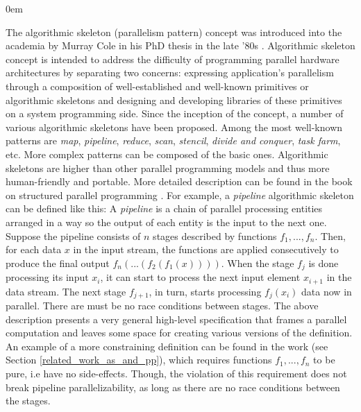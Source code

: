 \begin{description}[style=unboxed,leftmargin=0cm,noitemsep]
\itemsep0em
\item[Algorithmic skeletons or Parallelism Patterns] The algorithmic skeleton (parallelism pattern) concept was introduced into the academia by Murray Cole in his PhD thesis in the late ’80s \cite{mcole-thesis}. Algorithmic skeleton concept is intended to address the difficulty of programming parallel hardware architectures by separating two concerns: expressing application's parallelism through a composition of well-established and well-known primitives or algorithmic skeletons and designing and developing libraries of these primitives on a system programming side. Since the inception of the concept, a number of various algorithmic skeletons have been proposed. Among the most well-known patterns are \textit{map}, \textit{pipeline}, \textit{reduce}, \textit{scan}, \textit{stencil}, \textit{divide and conquer}, \textit{task farm}, etc. More complex patterns can be composed of the basic ones. Algorithmic skeletons are higher than other parallel programming models and thus more human-friendly and portable. More detailed description can be found in the book on structured parallel programming \cite{mccool-patterns}. For example, a \textit{pipeline} algorithmic skeleton can be defined like this:\newline\null
A \textit{pipeline} is a chain of parallel processing entities arranged in a way so the output of each entity is the input to the next one. Suppose the pipeline consists of $n$ stages described by functions $f_{1},...,f_{n}$. Then, for each data $x$ in the input stream, the functions are applied consecutively to produce the final output $f_{n}(...(f_{2}(f_{1}(x))))$. When the stage $f_{j}$ is done processing its input $x_{i}$, it can start to process the next input element $x_{i+1}$ in the data stream. The next stage $f_{j+1}$, in turn, starts processing $f_{j}(x_{i})$ data now in parallel. There are must be no race conditions between stages.\newline\null
\quad The above description presents a very general high-level specification that frames a parallel computation and leaves some space for creating various versions of the definition. An example of a more constraining definition can be found in the work \cite{skeletons-static} (see Section \ref{related_work_as_and_pp}), which requires functions $f_{1},...,f_{n}$ to be pure, i.e have no side-effects. Though, the violation of this requirement does not break pipeline parallelizability, as long as there are no race conditions between the stages.

\end{description}
